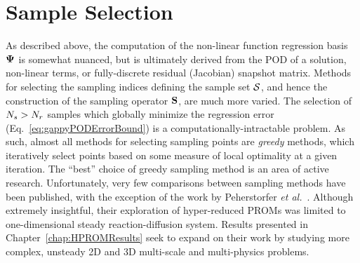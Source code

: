 \section{Sample Selection}\label{subsec:sampleSelect}

As described above, the computation of the non-linear function regression basis $\deimBasis$ is somewhat nuanced, but is ultimately derived from the POD of a solution, non-linear terms, or fully-discrete residual (Jacobian) snapshot matrix. Methods for selecting the sampling indices defining the sample set $\mathcal{S}$, and hence the construction of the sampling operator $\mathbf{S}$, are much more varied. The selection of $N_s > N_r$ samples which globally minimize the regression error (Eq.~\ref{eq:gappyPODErrorBound}) is a computationally-intractable problem. As such, almost all methods for selecting sampling points are \textit{greedy} methods, which iteratively select points based on some measure of local optimality at a given iteration. The ``best'' choice of greedy sampling method is an area of active research. Unfortunately, very few comparisons between sampling methods have been published, with the exception of the work by Peherstorfer \textit{et al.}~\cite{Peherstorfer2020}. Although extremely insightful, their exploration of hyper-reduced PROMs was limited to one-dimensional steady reaction-diffusion system. Results presented in Chapter~\ref{chap:HPROMResults} seek to expand on their work by studying more complex, unsteady 2D and 3D multi-scale and multi-physics problems.

